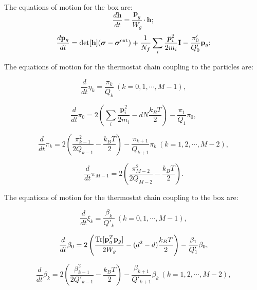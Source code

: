 \documentclass[12pt,a4paper]{report}
\newcommand{\vect}[1]{\boldsymbol{#1}}
\begin{document}
The equations of motion for the box are:
\begin{equation}
\frac{d\mathbf{h}}{dt} = \frac{\mathbf{p}_g}{W_g} \cdot \mathbf{h};
\end{equation}
\begin{equation}
\frac{d\mathbf{p}_g}{dt} = \det [\mathbf{h}] (\boldsymbol{\sigma}-\boldsymbol{\sigma}^{\rm ext}) + \frac{1}{N_f} \sum_i \frac{\vect{p}_i^2}{2m_i}\mathbf{I} -\frac{\pi'_0}{Q'_0} \mathbf{p}_g;
\end{equation}

The equations of motion for the thermostat chain coupling to the particles are:

\begin{equation}
\frac{d}{dt} \eta_k = \frac{\pi_k}{Q_k} ~(k = 0, 1, \cdots, M-1),
\end{equation}

\begin{equation}
\frac{d}{dt} \pi_0 =
2\left(
\sum_i \frac{\vect{p}_i^2}{2m_i} - dN\frac{k_BT}{2}
\right)
- \frac{\pi_1}{Q_1} \pi_0,
\end{equation}

\begin{equation}
\frac{d}{dt} \pi_k =
2\left( \frac{\pi_{k-1}^2}{2Q_{k-1}} - \frac{k_BT}{2} \right)
- \frac{\pi_{k+1}}{Q_{k+1}} \pi_{k} ~(k = 1, 2, \cdots, M-2),
\end{equation}

\begin{equation}
\frac{d}{dt} \pi_{M-1} =
2\left( \frac{\pi_{M-2}^2}{2Q_{M-2}} - \frac{k_BT}{2} \right).
\end{equation}

The equations of motion for the thermostat chain coupling to the box are:

\begin{equation}
\frac{d}{dt} \xi_k = \frac{\beta_k}{Q'_k} ~(k = 0, 1, \cdots, M-1),
\end{equation}

\begin{equation}
\frac{d}{dt} \beta_0 =
2\left(
 \frac{\textmd{Tr} [\mathbf{p}_g^{T} \mathbf{p}_g] }{2W_g} - (d^2-d)\frac{k_BT}{2}
\right)
- \frac{\beta_1}{Q'_1} \beta_0,
\end{equation}

\begin{equation}
\frac{d}{dt} \beta_k =
2\left( \frac{\beta_{k-1}^2}{2Q'_{k-1}} - \frac{k_BT}{2} \right)
- \frac{\beta_{k+1}}{Q'_{k+1}} \beta_{k} ~(k = 1, 2, \cdots, M-2),
\end{equation}
\end{document}
